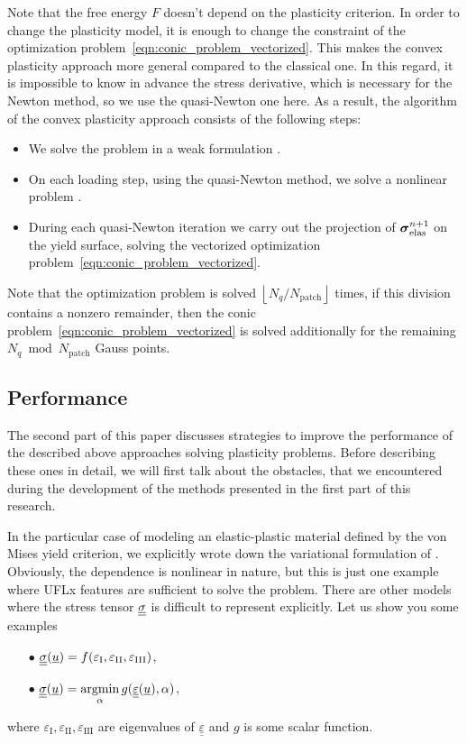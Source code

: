 \documentclass[12pt]{article}
\newcommand{\todolink}{\todo[fancyline, size=\scriptsize]{TOCITE}}
\begin{document}
Note that the free energy $F$ doesn't depend on the plasticity criterion. In order to change the plasticity model, it is enough to change the constraint of the optimization problem~\ref{eqn:conic_problem_vectorized}. This makes the convex plasticity approach more general compared to the classical one. In this regard, it is impossible to know in advance the stress derivative, which is necessary for the Newton method, so we use the quasi-Newton one here. As a result, the algorithm of the convex plasticity approach consists of the following steps:
\begin{itemize}
    \item We solve the problem in a weak formulation \todolink.
    \item On each loading step, using the quasi-Newton method, we solve a nonlinear problem \todolink.
    \item During each quasi-Newton iteration we carry out the projection of $\mbox{\boldmath$\sigma$}_\text{elas}^{n+1}$ on the yield surface, solving the vectorized optimization problem~\ref{eqn:conic_problem_vectorized}.
\end{itemize}
Note that the optimization problem is solved $\left\lfloor N_q / N_\text{patch}\right\rfloor$ times, if this division contains a nonzero remainder, then the conic problem~\ref{eqn:conic_problem_vectorized} is solved additionally for the remaining $N_q \bmod N_\text{patch}$ Gauss points. 

\subsection{Performance}

The second part of this paper discusses strategies to improve the performance of the described above approaches solving plasticity problems. Before describing these ones in detail, we will first talk about the obstacles, that we encountered during the development of the methods presented in the first part of this research. 

In the particular case of modeling an elastic-plastic material defined by the von Mises yield criterion, we explicitly wrote down the variational formulation of \todolink. Obviously, the dependence is nonlinear in nature, but this is just one example where UFLx features are sufficient to solve the problem. There are other models where the stress tensor $\underline{\underline{\sigma}}$ is difficult to represent explicitly. Let us show you some examples

\begin{itemize}
    \item[$\bullet$] $\underline{\underline{\sigma}}(\underline{u}) = f(\varepsilon_\text{I}, \varepsilon_\text{II}, \varepsilon_\text{III})$,
    \item[$\bullet$] $\underline{\underline{\sigma}}(\underline{u}) = \underset{\alpha}{\operatorname{argmin}}\, g(\underline{\underline{\varepsilon}}(\underline{u}),  \alpha)$,
\end{itemize}
where $\varepsilon_\text{I}, \varepsilon_\text{II}, \varepsilon_\text{III}$ are eigenvalues of $\underline{\underline{\varepsilon}}$ and $g$ is some scalar function.
\end{document}
